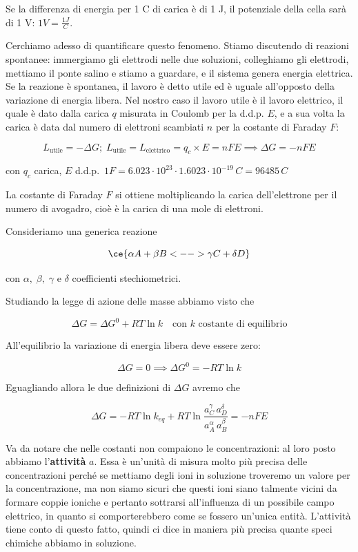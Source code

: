 Se la differenza di energia per 1 C di carica è di 1 J, il potenziale della cella sarà di 1 V: $1 V=\frac{1J}{C}$.

Cerchiamo adesso di quantificare questo fenomeno. Stiamo discutendo di reazioni spontanee: immergiamo gli elettrodi nelle due soluzioni, colleghiamo gli elettrodi, mettiamo il ponte salino e stiamo a guardare, e il sistema genera energia elettrica. Se la reazione è spontanea, il lavoro è detto utile ed è uguale all'opposto della variazione di energia libera. Nel nostro caso il lavoro utile è il lavoro elettrico, il quale è dato dalla carica $q$ misurata in Coulomb per la d.d.p. $E$, e a sua volta la carica è data dal numero di elettroni scambiati $n$ per la costante di Faraday $F$:

$$L_{\text{utile}}=- \Delta G; \; L_{\text{utile}}=L_{\text{elettrico}}=q_c \times E=nFE \implies \Delta G = -nFE$$

con $q_c$ carica, $E$ d.d.p.\, $1F=6.023 \cdot 10^{23} \cdot 1.6023 \cdot 10^{-19} \, C = 96485 \, C$

La costante di Faraday $F$ si ottiene moltiplicando la carica dell'elettrone per il numero di avogadro, cioè è la carica di una mole di elettroni.

Consideriamo una generica reazione

$$\ce{\alpha A + \beta B <--> \gamma C + \delta D}$$

con $\alpha, \; \beta, \; \gamma$ e $\delta$ coefficienti stechiometrici.

Studiando la legge di azione delle masse abbiamo visto che

$$\Delta G = \Delta G^0 + RT\ln k \quad \text{con }k \text{ costante di equilibrio}$$

All'equilibrio la variazione di energia libera deve essere zero:

$$\Delta G=0 \implies \Delta G^0= -RT \ln k$$

Eguagliando allora le due definizioni di $\Delta G$ avremo che

$$\Delta G =  -RT \ln k_{eq} + RT \ln \frac{a_C^{\gamma} \, a_D^{\delta}}{a_A^{\alpha} \, a_B^{\beta}}=-nFE$$

Va da notare che nelle costanti non compaiono le concentrazioni: al loro posto abbiamo l'\textbf{attività} $a$. Essa è un'unità di misura molto più precisa delle concentrazioni perché se mettiamo degli ioni in soluzione troveremo un valore per la concentrazione, ma non siamo sicuri che questi ioni siano talmente vicini da formare coppie ioniche e pertanto sottrarsi all'influenza di un possibile campo elettrico, in quanto si comporterebbero come se fossero un'unica entità. L'attività tiene conto di questo fatto, quindi ci dice in maniera più precisa quante speci chimiche abbiamo in soluzione.

